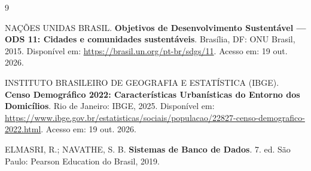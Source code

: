 \documentclass[12pt,a4paper]{article}
\begin{document}
\begin{thebibliography}{9}

NAÇÕES UNIDAS BRASIL. \textbf{Objetivos de Desenvolvimento Sustentável --- ODS 11: Cidades e comunidades sustentáveis}. Brasília, DF: ONU Brasil, 2015. Disponível em: \url{https://brasil.un.org/pt-br/sdgs/11}. Acesso em: 19 out. 2026.

INSTITUTO BRASILEIRO DE GEOGRAFIA E ESTATÍSTICA (IBGE). \textbf{Censo Demográfico 2022: Características Urbanísticas do Entorno dos Domicílios}. Rio de Janeiro: IBGE, 2025. Disponível em: \url{https://www.ibge.gov.br/estatisticas/sociais/populacao/22827-censo-demografico-2022.html}. Acesso em: 19 out. 2026.

ELMASRI, R.; NAVATHE, S. B. \textbf{Sistemas de Banco de Dados}. 7. ed. São Paulo: Pearson Education do Brasil, 2019.

\end{thebibliography}
\end{document}
